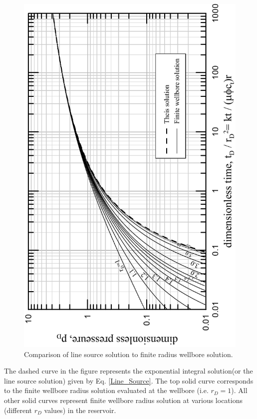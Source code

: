 \documentclass{llncs}
\numberwithin{equation}{section}
\numberwithin{figure}{section}
\numberwithin{table}{section}
\begin{document}
    \begin{figure}
        \begin{center}
        \includegraphics[scale=1]{Line_Finite_Comp.pdf}
        \end{center}
        \caption{Comparison of line source solution to finite radius wellbore solution\cite{Mueller_1965_1}.}
        \label{Line_Finite_Comp}
    \end{figure}

    The dashed curve in the figure represents the exponential integral solution(or the line source solution) given by Eq. \ref{Line_Source}. The top solid curve corresponds to the finite wellbore radius solution evaluated at the wellbore (i.e. $r_D=1$). All other solid curves represent finite wellbore radius solution at various locations (different $r_{D}$ values) in the reservoir.
\end{document}
